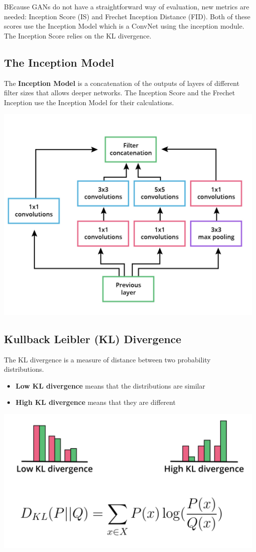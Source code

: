 BEcause GANs do not have a straightforward way of evaluation, new metrics are needed: Inception Score (IS) and Frechet Inception Distance (FID). Both of these scores use the Inception Model which is a ConvNet using the inception module. The Inception Score relies on the KL divergence.
\subsection{The Inception Model}
The \textbf{Inception Model} is a concatenation of the outputs of layers of different filter sizes that allows deeper networks. The Inception Score and the Frechet Inception use the Inception Model for their calculations.

\includegraphics[width=0.5\linewidth]{img//genAdvNet//deepGAN/screen-shot-2022-05-10-at-11.55.59-am.jpeg}


\subsection{Kullback Leibler (KL) Divergence}
The KL divergence is a measure of distance between two probability distributions.

\begin{itemize}
    \item \textbf{Low KL divergence} means that the distributions are similar
    \item \textbf{High KL divergence} means that they are different
\end{itemize}

\includegraphics[width=0.5\linewidth]{img//genAdvNet//deepGAN/screen-shot-2022-05-10-at-12.48.18-pm.jpeg}
